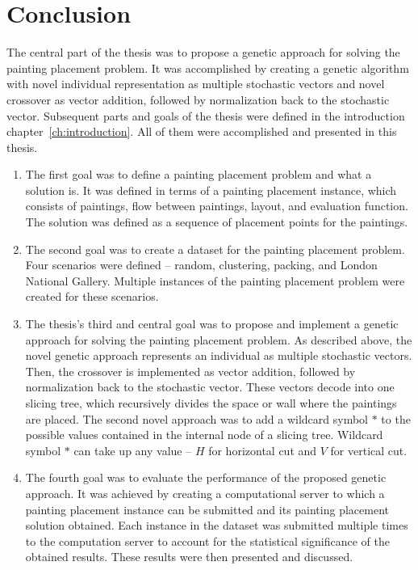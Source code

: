 \chapter{Conclusion}\label{ch:conclusion}

The central part of the thesis was to propose a genetic approach for solving the painting placement problem.
It was accomplished by creating a genetic algorithm with novel individual representation as multiple stochastic vectors
and novel crossover as vector addition, followed by normalization back to the stochastic vector.
Subsequent parts and goals of the thesis were defined in the introduction chapter~\ref{ch:introduction}.
All of them were accomplished and presented in this thesis.

\begin{enumerate}
    \item The first goal was to define a painting placement problem and what a solution is.
    It was defined in terms of a painting placement instance, which consists
    of paintings, flow between paintings, layout, and evaluation function.
    The solution was defined as a sequence of placement points for the paintings.

    \item  The second goal was to create a dataset for the painting placement problem.
    Four scenarios were defined – random, clustering, packing, and London National Gallery.
    Multiple instances of the painting placement problem were created for these scenarios.

    \item  The thesis's third and central goal was to propose and implement a genetic approach for solving the painting placement problem.
    As described above, the novel genetic approach represents an individual as multiple stochastic vectors.
    Then, the crossover is implemented as vector addition, followed by normalization back to the stochastic vector.
    These vectors decode into one slicing tree, which recursively divides the space or wall where the paintings are placed.
    The second novel approach was to add a wildcard symbol $*$ to the possible values contained in the internal node of a slicing tree.
    Wildcard symbol $*$ can take up any value – $H$ for horizontal cut and $V$ for vertical cut.

    \item  The fourth goal was to evaluate the performance of the proposed genetic approach.
    It was achieved by creating a computational server to which a painting placement
    instance can be submitted and its painting placement solution obtained.
    Each instance in the dataset was submitted multiple times to the computation server to account for the statistical significance of the obtained results.
    These results were then presented and discussed.


\end{enumerate}
